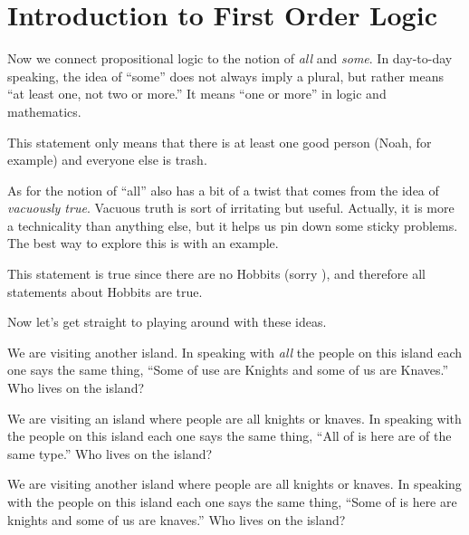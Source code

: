 \section{Introduction to First Order Logic}

Now we connect propositional logic to the notion of \emph{all} and \emph{some}.  In day-to-day speaking, the idea of ``some'' does not always imply a plural, but rather means ``at least one, not two or more.''  It means ``one or more'' in logic and mathematics.  
\begin{example}
This statement only means that there is at least one good person (Noah, for example) and everyone else is trash.
\end{example}
As for the notion of ``all'' also has a bit of a twist that comes from the idea of \emph{vacuously true}.  Vacuous truth is sort of irritating but useful.  Actually, it is more a technicality than anything else, but it helps us pin down some sticky problems.  The best way to explore this is with an example.   


\begin{example}
This statement is true since there are no Hobbits (sorry  \frownie), and therefore all statements about Hobbits are true.
\end{example}
Now let's get straight to playing around with these ideas.
\begin{problem}
We are visiting another island. In speaking with \emph{all} the people on this island each one says the same thing, ``Some of use are Knights and some of us are Knaves.''  Who lives on the island?
\end{problem}

\begin{problem}
We are visiting an island where people are all knights or knaves. In speaking with the people on this island each one says the same thing, ``All of is here are of the same type.''  Who lives on the island?
\end{problem}

\begin{problem}
We are visiting another island where people are all knights or knaves. In speaking with the people on this island each one says the same thing, ``Some of is here are knights and some of us are knaves.''   Who lives on the island?
\end{problem}

